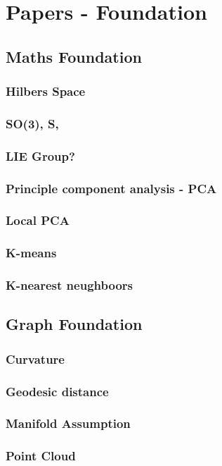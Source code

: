 \chapter{Papers - Foundation}

\section{Maths Foundation}
\subsection{Hilbers Space}
\subsection{SO(3), S,}
\subsection{LIE Group?}
\subsection{Principle component analysis - PCA}
\subsection{Local PCA}
\subsection{K-means}
\subsection{K-nearest neughboors}


\section{Graph Foundation}
\subsection{Curvature}
\subsection{Geodesic distance}
\subsection{Manifold Assumption}
\subsection{Point Cloud}
